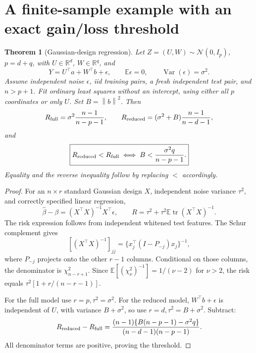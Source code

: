 \documentclass[11pt]{article}
\newtheorem{theorem}{Theorem}
\newcommand{\E}{\mathbb{E}}
\newcommand{\R}{\mathbb{R}}
\newcommand{\Var}{\operatorname{Var}}
\newcommand{\tr}{\operatorname{tr}}
\newcommand{\norm}[1]{\left\lVert #1\right\rVert}
\begin{document}
\section{A finite-sample example with an exact gain/loss threshold}
\begin{theorem}[Gaussian-design regression]
\label{thm:ols}
Let $Z=(U,W)\sim\mathcal N(0,I_p)$, $p=d+q$, with $U\in\R^d$, $W\in\R^q$, and
\[
 Y=U^\top a+W^\top b+\epsilon,\qquad
 \E\epsilon=0,\qquad \Var(\epsilon)=\sigma^2 .
\]
Assume independent noise $\epsilon$, iid training pairs, a fresh independent test pair, and $n>p+1$. Fit ordinary least squares \emph{without an intercept}, using either all $p$ coordinates or only $U$. Set $B=\norm b^2$. Then
\[
 R_{\rm full}=\sigma^2\frac{n-1}{n-p-1},\qquad
 R_{\rm reduced}=(\sigma^2+B)\frac{n-1}{n-d-1},
\]
and
\begin{equation}
 \boxed{R_{\rm reduced}<R_{\rm full}
 \iff B<\frac{\sigma^2q}{n-p-1}.}
 \label{eq:threshold}
\end{equation}
Equality and the reverse inequality follow by replacing $<$ accordingly.
\end{theorem}
\begin{proof}
For an $n\times r$ standard Gaussian design $X$, independent noise variance $\tau^2$, and correctly specified linear regression,
\[
 \widehat\beta-\beta=(X^\top X)^{-1}X^\top\epsilon,\qquad
 R=\tau^2+\tau^2\E\tr(X^\top X)^{-1}.
\]
The risk expression follows from independent whitened test features. The Schur complement gives
\[
 [(X^\top X)^{-1}]_{jj}=
 \{x_j^\top(I-P_{-j})x_j\}^{-1},
\]
where $P_{-j}$ projects onto the other $r-1$ columns. Conditional on those columns, the denominator is $\chi^2_{n-r+1}$. Since
$\E[(\chi^2_\nu)^{-1}]=1/(\nu-2)$ for $\nu>2$, the risk equals
$\tau^2[1+r/(n-r-1)]$.

For the full model use $r=p,\tau^2=\sigma^2$. For the reduced model, $W^\top b+\epsilon$ is independent of $U$, with variance $B+\sigma^2$, so use $r=d,\tau^2=B+\sigma^2$. Subtract:
\[
 R_{\rm reduced}-R_{\rm full}=
 \frac{(n-1)\{B(n-p-1)-\sigma^2q\}}
 {(n-d-1)(n-p-1)}.
\]
All denominator terms are positive, proving the threshold.
\end{proof}
\end{document}
